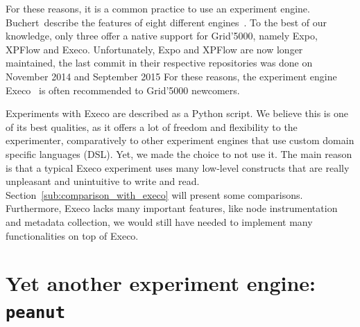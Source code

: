             For these reasons, it is a common practice to use an experiment engine. Buchert~\etal describe the features
            of eight different engines~\cite{buchert:hal-01087519}. To the best of our knowledge, only three offer a
            native support for Grid'5000, namely Expo, XPFlow and Execo. Unfortunately, Expo and XPFlow are now longer
            maintained, the last commit in their respective repositories was done on November 2014 and September 2015
            For these reasons, the experiment engine Execo~\cite{Imbert_2013} is often recommended to Grid'5000
            newcomers.

            Experiments with Execo are described as a Python script. We believe this is one of its best qualities, as it
            offers a lot of freedom and flexibility to the experimenter, comparatively to other experiment engines that
            use custom domain specific languages (DSL). Yet, we made the choice to not use it. The main reason is that a
            typical Execo experiment uses many low-level constructs that are really unpleasant and unintuitive to write
            and read. Section~\ref{sub:comparison_with_execo} will present some comparisons. Furthermore, Execo lacks
            many important features, like node instrumentation and metadata collection, \ie we would still have needed
            to implement many functionalities on top of Execo.

    \section{Yet another experiment engine: \texttt{peanut}}%
    \label{sec:peanut}
